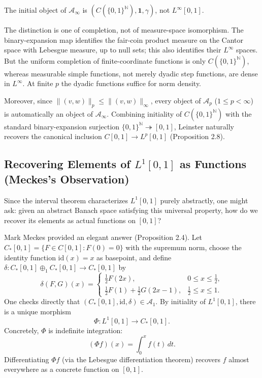\begin{proposition}
The initial object of $\mathcal{A}_\infty$ is $(C(\{0,1\}^{\mathbb{N}}), \mathbf{1}, \gamma)$, not $L^\infty[0,1]$.
\end{proposition}

The distinction is one of completion, not of measure-space isomorphism. The binary-expansion map identifies the fair-coin product measure on the Cantor space with Lebesgue measure, up to null sets; this also identifies their $L^\infty$ spaces. But the uniform completion of finite-coordinate functions is only $C(\{0,1\}^{\mathbb N})$, whereas measurable simple functions, not merely dyadic step functions, are dense in $L^\infty$. At finite $p$ the dyadic functions suffice for norm density.

Moreover, since $\|(v,w)\|_p \le \|(v,w)\|_\infty$, every object of $\mathcal{A}_p$ ($1 \le p < \infty$) is automatically an object of $\mathcal{A}_\infty$. Combining initiality of $C(\{0,1\}^{\mathbb{N}})$ with the standard binary-expansion surjection $\{0,1\}^{\mathbb{N}} \twoheadrightarrow [0,1]$, Leinster naturally recovers the canonical inclusion $C[0,1] \to L^p[0,1]$ (Proposition 2.8).

\subsection{Recovering Elements of $L^1[0,1]$ as Functions (Meckes's Observation)}

Since the interval theorem characterizes $L^1[0,1]$ purely abstractly, one might ask: given an abstract Banach space satisfying this universal property, how do we recover its elements as actual functions on $[0,1]$?

Mark Meckes provided an elegant answer (Proposition 2.4). Let $C_*[0,1] = \{F \in C[0,1] : F(0) = 0\}$ with the supremum norm, choose the identity function $\mathrm{id}(x) = x$ as basepoint, and define $\delta : C_*[0,1] \oplus_1 C_*[0,1] \to C_*[0,1]$ by
\[
    \delta(F, G)(x) =
    \begin{cases}
        \tfrac{1}{2} F(2x), & 0 \le x \le \tfrac{1}{2}, \\
        \tfrac{1}{2} F(1) + \tfrac{1}{2} G(2x - 1), & \tfrac{1}{2} \le x \le 1.
    \end{cases}
\]
One checks directly that $(C_*[0,1], \mathrm{id}, \delta) \in \mathcal{A}_1$. By initiality of $L^1[0,1]$, there is a unique morphism
\[
    \Phi : L^1[0,1] \longrightarrow C_*[0,1].
\]
Concretely, $\Phi$ is indefinite integration:
\[
    (\Phi f)(x) = \int_0^x f(t) \, dt.
\]
Differentiating $\Phi f$ (via the Lebesgue differentiation theorem) recovers $f$ almost everywhere as a concrete function on $[0,1]$.

